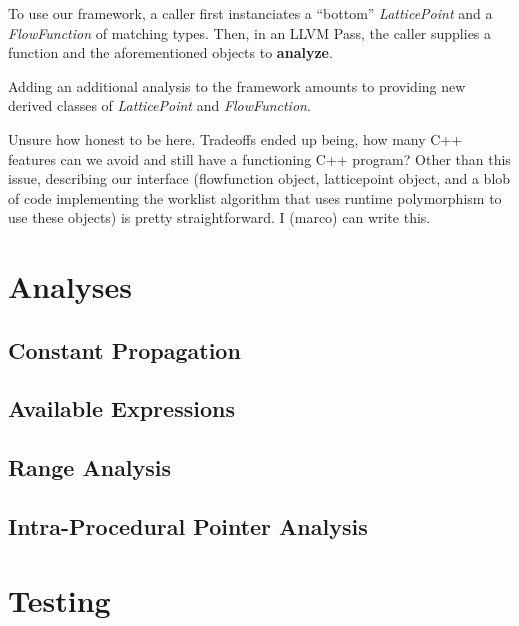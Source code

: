 \documentclass{article}
\theoremstyle{definition}
\begin{document}
To use our framework, a caller  first instanciates a ``bottom''
\emph{LatticePoint} and a \emph{FlowFunction} of matching types. Then,
in an LLVM Pass, the caller supplies a function and the aforementioned
objects to \textbf{analyze}. 

Adding an additional analysis to the framework amounts to providing
new derived classes of \emph{LatticePoint} and \emph{FlowFunction}.


Unsure how honest to be here. Tradeoffs ended up being, how many C++
features can we avoid and still have a functioning C++ program? Other
than this issue, describing our interface (flowfunction object,
latticepoint object, and a blob of code implementing the worklist
algorithm that uses runtime polymorphism to use these objects) is
pretty straightforward. I (marco) can write this.

\section{Analyses}

\subsection{Constant Propagation}


\subsection{Available Expressions}


\subsection{Range Analysis}



\subsection{Intra-Procedural Pointer Analysis}



\section{Testing}


\end{document}
